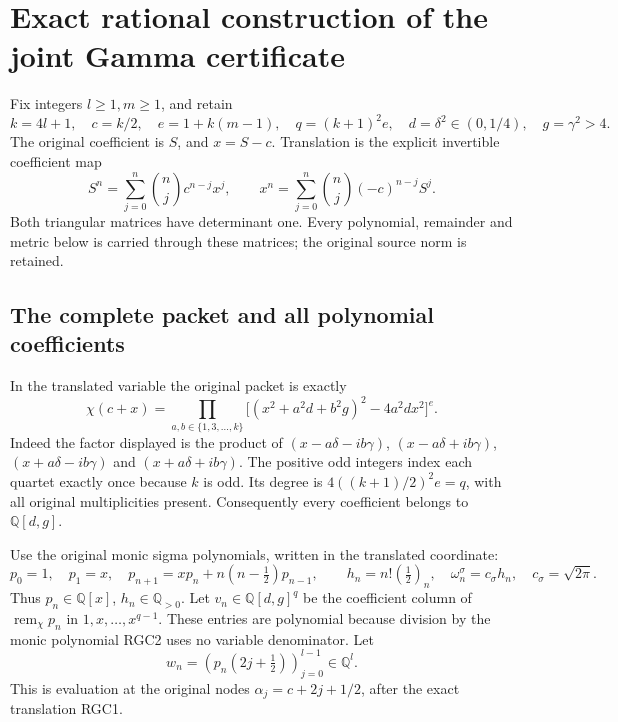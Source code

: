 \section{Exact rational construction of the joint Gamma certificate}
\label{sec:rational-gamma-certificate}
Fix integers $l\ge1,m\ge1$, and retain
\[
 k=4l+1,\quad c=k/2,\quad e=1+k(m-1),\quad q=(k+1)^2e,
 \quad d=\delta^2\in(0,1/4),\quad g=\gamma^2>4.
\]
The original coefficient is $S$, and $x=S-c$. Translation is the
explicit invertible coefficient map
\[
 S^n=\sum_{j=0}^n\binom njc^{n-j}x^j,\qquad
 x^n=\sum_{j=0}^n\binom nj(-c)^{n-j}S^j.\tag{RGC1}
\]
Both triangular matrices have determinant one. Every polynomial,
remainder and metric below is carried through these matrices; the
original source norm is retained.

\subsection{The complete packet and all polynomial coefficients}
In the translated variable the original packet is exactly
\[
 \chi(c+x)=\prod_{a,b\in\{1,3,\ldots,k\}}
 \bigl[(x^2+a^2d+b^2g)^2-4a^2dx^2\bigr]^e.\tag{RGC2}
\]
Indeed the factor displayed is the product of
$(x-a\delta-ib\gamma)$, $(x-a\delta+ib\gamma)$,
$(x+a\delta-ib\gamma)$ and $(x+a\delta+ib\gamma)$.
The positive odd integers index each quartet exactly once because
$k$ is odd. Its degree is $4((k+1)/2)^2e=q$, with all original
multiplicities present. Consequently every coefficient belongs to
$\mathbb Q[d,g]$.

Use the original monic sigma polynomials, written in the translated
coordinate:
\[
 p_0=1,\quad p_1=x,\quad
 p_{n+1}=xp_n+n(n-\tfrac12)p_{n-1},\qquad
 h_n=n!(\tfrac12)_n,\quad \omega_n^\sigma=c_\sigma h_n,
 \quad c_\sigma=\sqrt{2\pi}.\tag{RGC3}
\]
Thus $p_n\in\mathbb Q[x]$, $h_n\in\mathbb Q_{>0}$.
Let $v_n\in\mathbb Q[d,g]^q$ be the coefficient column of
$\operatorname{rem}_{\chi}p_n$ in $1,x,\ldots,x^{q-1}$.
These entries are polynomial because division by the monic
polynomial RGC2 uses no variable denominator. Let
\[
 w_n=(p_n(2j+\tfrac12))_{j=0}^{l-1}\in\mathbb Q^l.
 \tag{RGC4}
\]
This is evaluation at the original nodes $\alpha_j=c+2j+1/2$,
after the exact translation RGC1.


